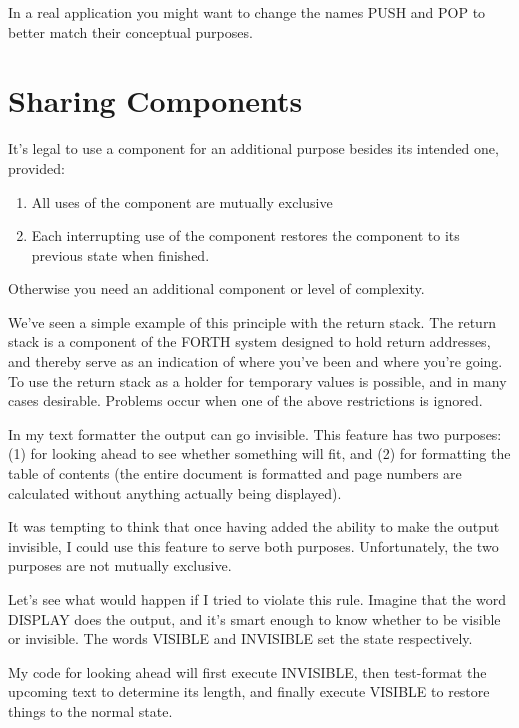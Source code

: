 In a real application you might want to change the names PUSH
and POP to better match their conceptual purposes.

\section{Sharing Components}
\begin{tip}
It's legal to use a component for an additional purpose besides its intended
one, provided:

\begin{enumerate}
\item All uses of the component are mutually exclusive
\item Each interrupting use of the component restores the component to
   its previous state when finished.
\end{enumerate}

Otherwise you need an additional component or level of complexity.
\end{tip}
We've seen a simple example of this principle with the return stack. The
return stack is a component of the FORTH system designed to hold
return addresses, and thereby serve as an indication of where you've been
and where you're going. To use the return stack as a holder for temporary
values is possible, and in many cases desirable. Problems occur when one
of the above restrictions is ignored.

In my text formatter the output can go invisible. This feature has
two purposes: (1) for looking ahead to see whether something will fit, and
(2) for formatting the table of contents (the entire document is formatted
and page numbers are calculated without anything actually being
displayed).

It was tempting to think that once having added the ability to make
the output invisible, I could use this feature to serve both purposes.
Unfortunately, the two purposes are not mutually exclusive.

Let's see what would happen if I tried to violate this rule. Imagine
that the word DISPLAY does the output, and it's smart enough to know
whether to be visible or invisible. The words VISIBLE and INVISIBLE
set the state respectively.

My code for looking ahead will first execute INVISIBLE, then
test-format the upcoming text to determine its length, and finally execute
VISIBLE to restore things to the normal state.

